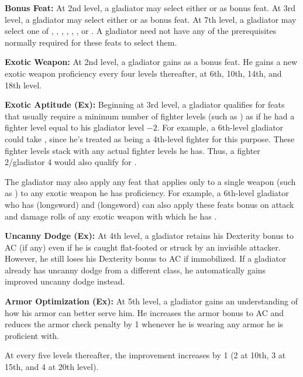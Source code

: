 \textbf{Bonus Feat:} At 2nd level, a gladiator may select either  or  as bonus feat. At 3rd level, a gladiator may select either  or  as bonus feat. At 7th level, a gladiator may select one of , , , , , , or . A gladiator need not have any of the prerequisites normally required for these feats to select them.

\textbf{Exotic Weapon:} At 2nd level, a gladiator gains  as a bonus feat. He gains a new exotic weapon proficiency every four levels thereafter, at 6th, 10th, 14th, and 18th level.

\textbf{Exotic Aptitude (Ex):} Beginning at 3rd level, a gladiator qualifies for feats that usually require a minimum number of fighter levels (such as ) as if he had a fighter level equal to his gladiator level $-2$. For example, a 6th-level gladiator could take , since he's treated as being a 4th-level fighter for this purpose. These fighter levels stack with any actual fighter levels he has. Thus, a fighter 2/gladiator 4 would also qualify for .

The gladiator may also apply any feat that applies only to a single weapon (such as ) to any exotic weapon he has proficiency. For example, a 6th-level gladiator who has  (longsword) and  (longsword) can also apply these feats bonus on attack and damage rolls of any exotic weapon with which he has .

\textbf{Uncanny Dodge (Ex):} At 4th level, a gladiator retains his Dexterity bonus to AC (if any) even if he is caught flat-footed or struck by an invisible attacker. However, he still loses his Dexterity bonus to AC if immobilized. If a gladiator already has uncanny dodge from a different class, he automatically gains improved uncanny dodge instead.

\textbf{Armor Optimization (Ex):} At 5th level, a gladiator gains an understanding of how his armor can better serve him. He increases the armor bonus to AC and reduces the armor check penalty by 1 whenever he is wearing any armor he is proficient with.

At every five levels thereafter, the improvement increases by 1 (2 at 10th, 3 at 15th, and 4 at 20th level).

